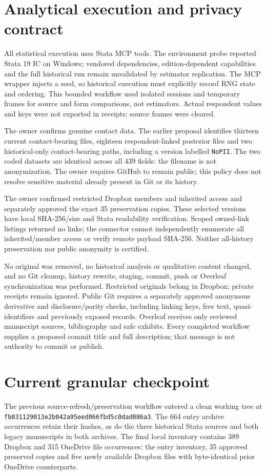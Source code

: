 \documentclass[11pt,a4paper]{article}
\begin{document}
\section{Analytical execution and privacy contract}
All statistical execution uses Stata MCP tools. The environment probe reported Stata 19 IC on Windows; vendored dependencies, edition-dependent capabilities and the full historical run remain unvalidated by estimator replication. The MCP wrapper injects a seed, so historical execution must explicitly record RNG state and ordering. This bounded workflow used isolated sessions and temporary frames for source and form comparisons, not estimators. Actual respondent values and keys were not exported in receipts; source frames were cleared.

The owner confirms genuine contact data. The earlier proposal identifies thirteen current contact-bearing files, eighteen respondent-linked posterior files and two historical-only contact-bearing paths, including a version labelled \texttt{NoPII}. The two coded datasets are identical across all 439 fields: the filename is not anonymization. The owner requires GitHub to remain public; this policy does not resolve sensitive material already present in Git or its history.

The owner confirmed restricted Dropbox members and inherited access and separately approved the exact 35 preservation copies. These selected versions have local SHA-256/size and Stata readability verification. Scoped owned-link listings returned no links; the connector cannot independently enumerate all inherited/member access or verify remote payload SHA-256. Neither all-history preservation nor public anonymity is certified.

No original was removed, no historical analysis or qualitative content changed, and no Git cleanup, history rewrite, staging, commit, push or Overleaf synchronization was performed. Restricted originals belong in Dropbox; private receipts remain ignored. Public Git requires a separately approved anonymous derivative and disclosure/parity checks, including linking keys, free text, quasi-identifiers and previously exposed records. Overleaf receives only reviewed manuscript sources, bibliography and safe exhibits. Every completed workflow supplies a proposed commit title and full description; that message is not authority to commit or publish.

\section{Current granular checkpoint}
The previous source-refresh/preservation workflow entered a clean working tree at \texttt{fb031129013e2b042a95eed066fbd5c0dad086a3}. The 664 entry archive occurrences retain their hashes, as do the three historical Stata sources and both legacy manuscripts in both archives. The final local inventory contains 389 Dropbox and 315 OneDrive file occurrences: the entry inventory, 35 approved preserved copies and five newly available Dropbox files with byte-identical prior OneDrive counterparts.
\end{document}
